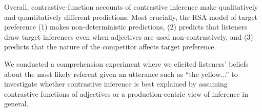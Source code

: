 \documentclass[a4paper,man,floatsintext,natbib]{apa6}
\newcommand{\ek}[1]{\textcolor{Orange}{[ek: #1]}}
\begin{document}
Overall, contrastive-function accounts of contrastive inference make qualitatively and quantitatively different predictions. Most crucially, the RSA model of target preference (1) makes non-deterministic predictions, (2) predicts that listeners draw target inferences even when adjectives are used non-contrastively, and (3) predicts that the nature of the competitor affects target preference.



We conducted a comprehension experiment where we elicited listeners' beliefs about the most likely referent given an utterance such as ``the yellow...'' to investigate whether contrastive inference is best explained by assuming contrastive functions of adjectives or a production-centric view of inference in general.























\end{document}
